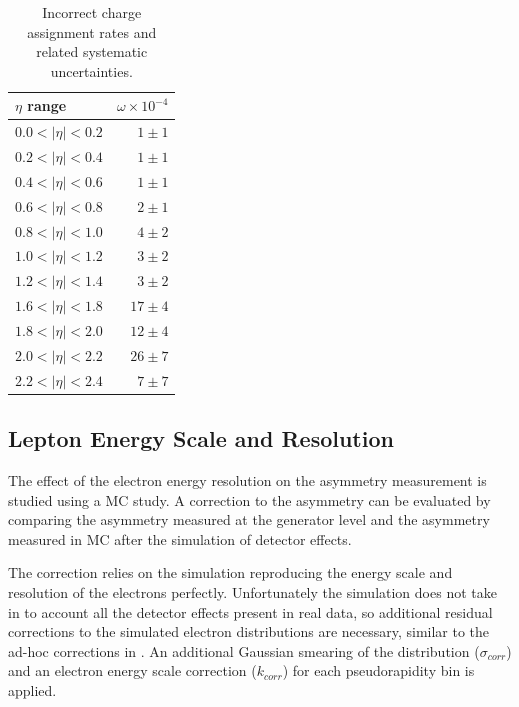 \begin{table}[htbp]
  \begin{center}
\begin{tabular}{lr}
\toprule
$\eta$ range        & $\omega \times 10^{-4}$    \\
\midrule
$0.0<| \eta |<0.2$  & $ 1 \pm 1 $    \\ 
$0.2<| \eta |<0.4$  & $ 1 \pm 1 $    \\
$0.4<| \eta |<0.6$  & $ 1 \pm 1 $    \\
$0.6<| \eta |<0.8$  & $ 2 \pm 1 $    \\
$0.8<| \eta |<1.0$  & $ 4 \pm 2 $    \\ 
$1.0<| \eta |<1.2$  & $ 3 \pm 2 $    \\
$1.2<| \eta |<1.4$  & $ 3 \pm 2 $    \\
$1.6<| \eta |<1.8$  & $17 \pm 4 $    \\
$1.8<| \eta |<2.0$  & $12 \pm 4 $    \\
$2.0<| \eta |<2.2$  & $26 \pm 7 $    \\
$2.2<| \eta |<2.4$  & $ 7 \pm 7 $    \\
\bottomrule
\end{tabular}
\caption{\label{tab:mischarge}Incorrect charge assignment rates and related
systematic uncertainties\cite{bendavid2011electron}.}
\end{center}
\end{table}

\subsection{Lepton Energy Scale and Resolution}
The effect of the electron energy resolution on the asymmetry measurement is
studied using a {MC} study. A correction to the asymmetry can be evaluated by
comparing the asymmetry measured at the generator level and the asymmetry
measured in {MC} after the simulation of detector effects.

The correction relies on the simulation reproducing the energy scale and
resolution of the electrons perfectly. Unfortunately the simulation does not
take in to account all the detector effects present in real data, so additional
residual corrections to the simulated electron \pT distributions are necessary,
similar to the ad-hoc corrections in . 
An additional Gaussian smearing of the \pT distribution ($\sigma_{corr}$) and an
electron energy scale correction ($k_{corr}$) for each pseudorapidity bin is
applied\cite{bauer2011higgs}.

